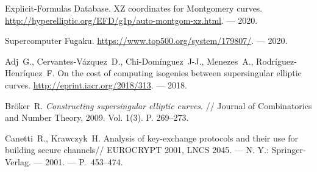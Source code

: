 \documentclass[a4paper,12pt]{article}
\theoremstyle{definition}
\renewcommand{\baselinestretch}{1.35}
\begin{document}
  \renewcommand{\baselinestretch}{.9}\large
\newcommand{\noopsort}[1]{} \newcommand{\printfirst}[2]{#1}
  \newcommand{\singleletter}[1]{#1} \newcommand{\switchargs}[2]{#2#1}
\begin{thebibliography}{1}







 Explicit-Formulas Database. XZ coordinates for Montgomery curves. \url{http://hyperelliptic.org/EFD/g1p/auto-montgom-xz.html}. --- 2020.

 Supercomputer Fugaku. \url{https://www.top500.org/system/179807/}. --- 2020.




 Adj~G., Cervantes-Vázquez~D., Chi-Domínguez~J-J.,  Menezes~A., Rodríguez-Henríquez~F. On the cost of computing isogenies between supersingular elliptic curves.  \url{http://eprint.iacr.org/2018/313}. --- 2018.


 Bröker~R. {\it Constructing supersingular elliptic curves}. // Journal of Combinatorics and Number Theory, 2009. Vol. 1(3). P. 269--273.

Canetti~R., Krawczyk~H.
\newblock
\newblock Analysis of key-exchange protocols and their use for building secure
 channels// EUROCRYPT 2001, LNCS 2045.
\newblock --- N. Y.: Springer-Verlag.
\newblock --- 2001.
\newblock ---  P.~453--474.



\end{thebibliography}
\end{document}

